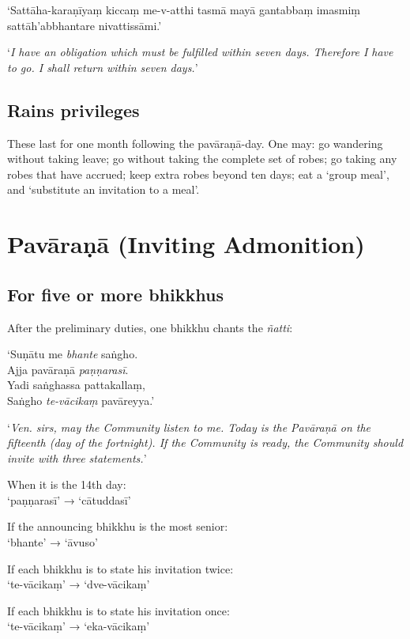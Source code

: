 ‘Sattāha-karaṇīyaṃ kiccaṃ me-v-atthi tasmā mayā gantabbaṃ imasmiṃ
sattāh'abbhantare nivattissāmi.’

‘\emph{I have an obligation which must be fulfilled within seven days. Therefore
  I have to go. I shall return within seven days.}’\\
\mbox{}

\subsection{Rains privileges}

These last for one month following the pavāraṇā-day. One may: go wandering
without taking leave; go without taking the complete set of robes; go taking any
robes that have accrued; keep extra robes beyond ten days; eat a ‘group meal’,
and ‘substitute an invitation to a meal’.

\section{Pavāraṇā (Inviting Admonition)}

\subsection{For five or more bhikkhus}

After the preliminary duties, one bhikkhu chants the \emph{ñatti}:

‘Suṇātu me \emph{bhante} saṅgho.\\
Ajja pavāraṇā \emph{paṇṇarasī}.\\
Yadi saṅghassa pattakallaṃ,\\
Saṅgho \emph{te-vācikaṃ} pavāreyya.’

‘\emph{Ven. sirs, may the Community listen to me. Today is the Pavāraṇā on the
  fifteenth (day of the fortnight). If the Community is ready, the Community
  should invite with three statements.}’


When it is the 14th day:\\
‘paṇṇarasī’ → ‘cātuddasī’

If the announcing bhikkhu is the most senior:\\
‘bhante’ → ‘āvuso’

If each bhikkhu is to state his invitation twice:\\
‘te-vācikaṃ’ → ‘dve-vācikaṃ’

If each bhikkhu is to state his invitation once:\\
‘te-vācikaṃ’ → ‘eka-vācikaṃ’

